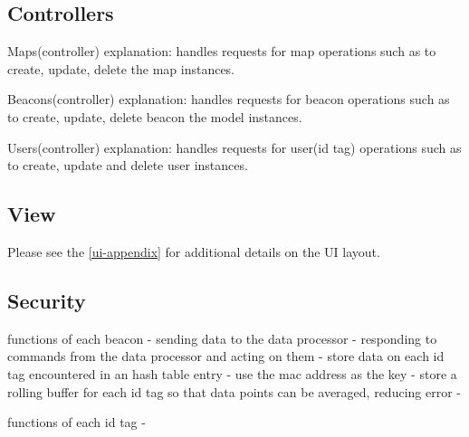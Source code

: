 \subsection{Controllers}
Maps(controller)
	explanation: handles requests for map operations such as to create, update, delete the map instances.

Beacons(controller)
	explanation: handles requests for beacon operations such as to create, update, delete beacon the model instances.

Users(controller)
	explanation: handles requests for user(id tag) operations such as to create, update and delete user instances.

\subsection{View}
Please see the \ref{ui-appendix} for additional details on the UI layout.


\subsection{Security}


\bigskip

functions of each beacon
	- sending data to the data processor
	- responding to commands from the data processor and acting on them
	- store data on each id tag encountered in an hash table entry - use the mac address as the key
	- store a rolling buffer for each id tag so that data points can be averaged, reducing error
	-

\bigskip

functions of each id tag
	-




